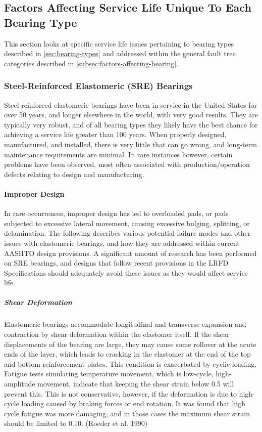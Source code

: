 \subsection{Factors Affecting Service Life Unique To Each Bearing Type}
This section looks at specific service life issues pertaining to bearing types described in \cref{sec:bearing-types} and addressed within the general fault tree categories described in \cref{subsec:factors-affecting-bearing}.

\subsubsection{Steel-Reinforced Elastomeric (SRE) Bearings}
Steel reinforced elastomeric bearings have been in service in the United States for over 50 years, and longer elsewhere in the world, with very good results. They are typically very robust, and of all bearing types they likely have the best chance for achieving a service life greater than 100 years. When properly designed, manufactured, and installed, there is very little that can go wrong, and long-term maintenance requirements are minimal. In rare instances however, certain problems have been observed, most often associated with production/operation defects relating to design and manufacturing.

\paragraph{Improper Design}
In rare occurrences, improper design has led to overloaded pads, or pads subjected to excessive lateral movement, causing excessive bulging, splitting, or delamination. The following describes various potential failure modes and other issues with elastomeric bearings, and how they are addressed within current AASHTO design provisions. A significant amount of research has been performed on SRE bearings, and designs that follow recent provisions in the LRFD Specifications should adequately avoid these issues as they would affect service life.


\subparagraph{Shear Deformation}
Elastomeric bearings accommodate longitudinal and transverse expansion and contraction by shear deformation
within the elastomer itself. If the shear displacements of the bearing are large, they may cause some rollover at the
acute ends of the layer, which leads to cracking in the elastomer at the end of the top and bottom reinforcement
plates. This condition is exacerbated by cyclic loading. Fatigue tests simulating temperature movement, which is
low-cycle, high-amplitude movement, indicate that keeping the shear strain below 0.5 will prevent this. This is not
conservative, however, if the deformation is due to high-cycle loading caused by braking forces or end rotation. It
was found that high cycle fatigue was more damaging, and in those cases the maximum shear strain should be limited
to 0.10. (Roeder et al. 1990)


